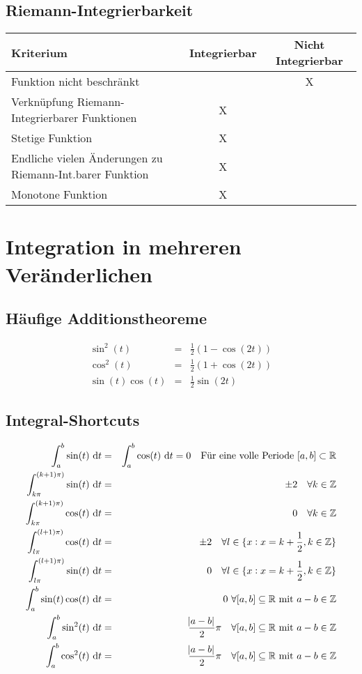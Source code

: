 \section{Riemann-Integrierbarkeit}
\begin{center}
    \begin{tabular}{lcc}
        \toprule
        Kriterium & Integrierbar & Nicht Integrierbar \\
        \midrule
        Funktion nicht beschränkt & & X \\
        Verknüpfung Riemann-Integrierbarer Funktionen & X \\
        Stetige Funktion & X\\
        Endliche vielen Änderungen zu Riemann-Int.barer Funktion & X\\
        Monotone Funktion & X\\
        \bottomrule
    \end{tabular}
\end{center}

\chapter{Integration in mehreren Veränderlichen}
\section{Häufige Additionstheoreme}
\begin{eqnarray*}
    \sin^2(t) &=& \frac{1}{2} (1 - \cos(2t))\\
    \cos^2(t) &=& \frac{1}{2} (1 + \cos(2t))\\
    \sin(t) \cos(t) &=& \frac{1}{2} \sin(2t)
\end{eqnarray*}

\section{Integral-Shortcuts}
\begin{eqnarray*}
    \int_{a}^{b}{\sin(t)\text{ d}t} &=& \int_{a}^{b}{\cos(t)\text{ d}t} = 0 \quad \text{Für eine volle Periode} \ [a,b] \subset \mathbb{R} \\
    \int_{k\pi}^{(k+1)\pi)}{\sin(t)\text{ d}t} &=& \pm 2 \quad \forall k \in \mathbb{Z} \\
    \int_{k\pi}^{(k+1)\pi)}{\cos(t)\text{ d}t} &=& 0 \quad \forall k \in \mathbb{Z} \\
    \int_{l\pi}^{(l+1)\pi)}{\cos(t)\text{ d}t} &=& \pm 2 \quad \forall l \in \{x:x=k+\frac{1}{2}, k\in\mathbb{Z}\} \\
    \int_{l\pi}^{(l+1)\pi)}{\sin(t)\text{ d}t} &=& 0 \quad \forall l \in \{x:x=k+\frac{1}{2}, k\in\mathbb{Z}\} \\
    \int_{a}^{b}{\sin(t)\cos(t)\text{ d}t} &=& 0 \ \forall [a,b]\subseteq\mathbb{R} \ \text{mit} \ a-b\in\mathbb{Z} \\
    \int_{a}^{b}{\sin^2(t)\text{ d}t} &=& \frac{\abs{a-b}}{2}\pi \quad \forall [a,b]\subseteq\mathbb{R} \ \text{mit} \ a-b\in\mathbb{Z} \\
    \int_{a}^{b}{\cos^2(t)\text{ d}t} &=& \frac{\abs{a-b}}{2}\pi \quad \forall [a,b]\subseteq\mathbb{R} \ \text{mit} \ a-b\in\mathbb{Z}
\end{eqnarray*}
